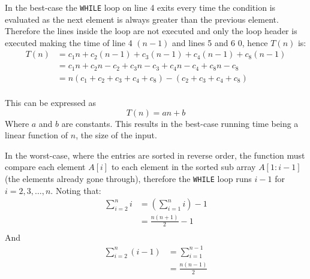 \documentclass[12pt letter]{report}
\begin{document}
In the best-case the \lstinline{WHILE} loop on line 4 exits every time the condition is evaluated as the next element is
always greater than the previous element. Therefore the lines inside the loop are not executed and only the loop header
is executed making the time of line 4 $\left( n-1 \right) $ and lines 5 and 6 $0$, hence $T \left( n \right) $ is:
\begin{align*}
  T \left( n \right) & = c_1 n + c_2 \left( n-1 \right) + c_3 \left( n - 1 \right) + c_4 \left( n - 1 \right) + c_8 \left(
  n-1\right)                                                                                                               \\
                     & = c_1n + c_2n - c_2 + c_3n - c_3 + c_4n -c_4 + c_8n - c_8                                           \\
                     & = n \left( c_1+c_2+c_3+c_4+c_8 \right) - \left( c_2 + c_3 + c_4 + c_8 \right)                       \\
\end{align*}

This can be expressed as
\[
  T \left( n \right)  = an + b
\]
Where $a$ and $b$ are constants. This results in the best-case running time being a linear function of $n$, the size of
the input.

In the worst-case, where the entries are sorted in reverse order, the function must compare each element $A \left[ i \right] $ to each
element in the sorted sub array $A \left[ 1: i-1 \right] $ (the elements already gone through), therefore the \lstinline{WHILE} loop runs $i-1$ for $i =
  2,3,\ldots,n$. Noting that:
\begin{align*}
  \displaystyle\sum_{i=2}^{n} i & = \left( \displaystyle\sum_{i=1}^{n} i \right) - 1 \\
                                & = \frac{n \left( n + 1 \right) }{2} -1             \\
\end{align*}
And
\begin{align*}
  \displaystyle\sum_{i=2}^{n} \left( i - 1 \right) & = \displaystyle\sum_{i=1}^{n-1}    \\
                                                   & = \frac{n \left( n -1 \right) }{2} \\
\end{align*}
\end{document}

